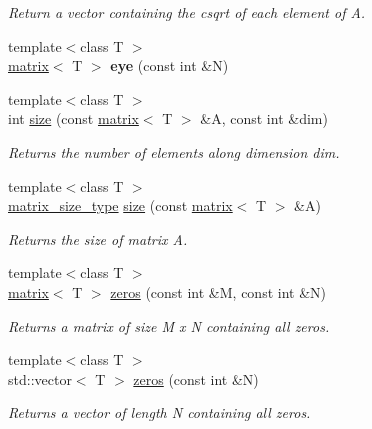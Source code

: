 \begin{DoxyCompactItemize}
\begin{DoxyCompactList}\small\item\em Return a vector containing the csqrt of each element of A. \end{DoxyCompactList}\item 
\hypertarget{namespacekeycpp_a8ae33fb19a521ab1ec1f22e7c39ca076}{{\footnotesize template$<$class T $>$ }\\\hyperlink{classkeycpp_1_1matrix}{matrix}$<$ T $>$ {\bfseries eye} (const int \&N)}\label{namespacekeycpp_a8ae33fb19a521ab1ec1f22e7c39ca076}

\item 
{\footnotesize template$<$class T $>$ }\\int \hyperlink{namespacekeycpp_a2824156817719ffe96a842dd0ef27ae5}{size} (const \hyperlink{classkeycpp_1_1matrix}{matrix}$<$ T $>$ \&A, const int \&dim)
\begin{DoxyCompactList}\small\item\em Returns the number of elements along dimension dim. \end{DoxyCompactList}\item 
{\footnotesize template$<$class T $>$ }\\\hyperlink{structkeycpp_1_1matrix__size__type}{matrix\-\_\-size\-\_\-type} \hyperlink{namespacekeycpp_ae713df143a5e71da166f450e01a536e2}{size} (const \hyperlink{classkeycpp_1_1matrix}{matrix}$<$ T $>$ \&A)
\begin{DoxyCompactList}\small\item\em Returns the size of matrix A. \end{DoxyCompactList}\item 
{\footnotesize template$<$class T $>$ }\\\hyperlink{classkeycpp_1_1matrix}{matrix}$<$ T $>$ \hyperlink{namespacekeycpp_a5699c522088657287bf0ac01173b716c}{zeros} (const int \&M, const int \&N)
\begin{DoxyCompactList}\small\item\em Returns a matrix of size M x N containing all zeros. \end{DoxyCompactList}\item 
{\footnotesize template$<$class T $>$ }\\std\-::vector$<$ T $>$ \hyperlink{namespacekeycpp_a9a0f013931cb9989320b014d151cc527}{zeros} (const int \&N)
\begin{DoxyCompactList}\small\item\em Returns a vector of length N containing all zeros. \end{DoxyCompactList}\item 

\end{DoxyCompactItemize}
